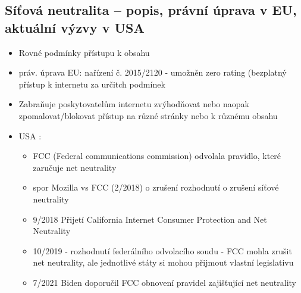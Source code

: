 \subsection{Síťová neutralita -- popis, právní úprava v EU, aktuální výzvy v USA}
\begin{itemize}
    \item Rovné podmínky přístupu k obsahu
    \item práv. úprava EU: nařízení č. 2015/2120 - umožněn zero rating (bezplatný přístup k internetu za určitch podmínek
    \item Zabraňuje poskytovatelům internetu zvýhodňovat nebo naopak zpomalovat/blokovat přístup na různé stránky nebo k různému obsahu
    \item USA : \begin{itemize}
        \item  FCC (Federal communications commission) odvolala pravidlo, které zaručuje net neutrality
        \item spor Mozilla vs FCC (2/2018) o zrušení rozhodnutí o zrušení síťové neutrality
        \item 9/2018 Přijetí California Internet Consumer Protection and Net Neutrality
        \item 10/2019 - rozhodnutí federálního odvolacího soudu - FCC mohla zrušit net neutrality, ale jednotlivé státy si mohou přijmout vlastní legislativu
        \item 7/2021 Biden doporučil FCC obnovení pravidel zajišťující net neutrality
    \end{itemize}
\end{itemize}


